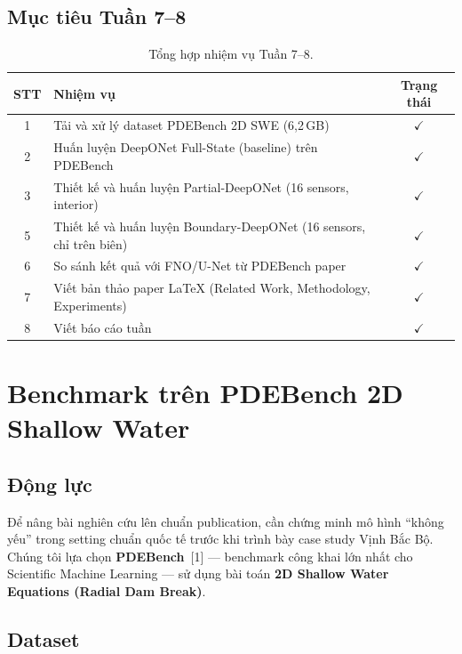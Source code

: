 \documentclass[12pt,a4paper]{article}
\begin{document}
\subsection{Mục tiêu Tuần 7--8}

\begin{table}[ht]
  \centering
  \caption{Tổng hợp nhiệm vụ Tuần 7--8.}
  \label{tab:tasks}
  \begin{tabular}{@{}clc@{}}
    \toprule
    \textbf{STT} & \textbf{Nhiệm vụ} & \textbf{Trạng thái} \\
    \midrule
    1 & Tải và xử lý dataset PDEBench 2D SWE (6,2\,GB) & $\checkmark$ \\
    2 & Huấn luyện DeepONet Full-State (baseline) trên PDEBench & $\checkmark$ \\
    3 & Thiết kế và huấn luyện Partial-DeepONet (16 sensors, interior) & $\checkmark$ \\
    5 & Thiết kế và huấn luyện Boundary-DeepONet (16 sensors, chỉ trên biên) & $\checkmark$ \\
    6 & So sánh kết quả với FNO/U-Net từ PDEBench paper & $\checkmark$ \\
    7 & Viết bản thảo paper LaTeX (Related Work, Methodology, Experiments) & $\checkmark$ \\
    8 & Viết báo cáo tuần & $\checkmark$ \\
    \bottomrule
  \end{tabular}
\end{table}

\section{Benchmark trên PDEBench 2D Shallow Water}

\subsection{Động lực}

Để nâng bài nghiên cứu lên chuẩn publication, cần chứng minh mô hình ``không yếu'' trong setting chuẩn quốc tế trước khi trình bày case study Vịnh Bắc Bộ. Chúng tôi lựa chọn \textbf{PDEBench}~[1] --- benchmark công khai lớn nhất cho Scientific Machine Learning --- sử dụng bài toán \textbf{2D Shallow Water Equations (Radial Dam Break)}.

\subsection{Dataset}
\end{document}
